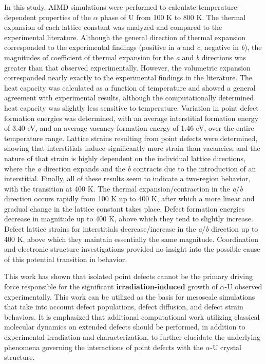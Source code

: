 \documentclass[utf8]{frontiersSCNS} %
\providecommand{\DIFaddtex}[1]{{\bf #1}} %
\providecommand{\DIFdeltex}[1]{} %
\providecommand{\DIFaddbegin}{\protect\color{blue}} %
\providecommand{\DIFaddend}{\protect\color{black}} %
\providecommand{\DIFdelbegin}{\protect\color{red}} %
\providecommand{\DIFdelend}{\protect\color{black}} %
\providecommand{\DIFadd}[1]{\texorpdfstring{\DIFaddtex{#1}}{#1}} %
\providecommand{\DIFdel}[1]{\texorpdfstring{\DIFdeltex{#1}}{}} %
\begin{document}
In this study, AIMD simulations were performed to calculate temperature-dependent properties of the $\alpha$ phase of U from 100 K to 800 K. The thermal expansion of each \DIFdelbegin \DIFdel{individual }\DIFdelend lattice constant was analyzed and compared to the experimental literature. Although the general direction of thermal expansion corresponded to the experimental findings (positive in \textit{a} and \textit{c}, negative in \textit{b}), the magnitudes of coefficient of thermal expansion for the \textit{a} and \textit{b} directions was greater than that observed experimentally. However, the volumetric expansion corresponded nearly exactly to the experimental findings in the literature. The heat capacity was calculated as a function of temperature and showed a general agreement with experimental results, although the computationally determined heat capacity was slightly less sensitive to temperature. Variation in point defect formation energies was determined, with an average interstitial formation energy of 3.40 eV, and an average vacancy formation energy of 1.46 eV, over the entire temperature range. Lattice strains resulting from point defects were determined, showing that interstitials induce significantly more strain than vacancies, and the nature of that strain is highly dependent on the individual lattice directions, where the \textit{a} direction expands and the \textit{b} contracts due to the introduction of an interstitial. Finally, all of these results seem to indicate a two-region behavior, with the transition at 400 K. The thermal expansion\DIFdelbegin \DIFdel{expansion}\DIFdelend /contraction in the \textit{a}/\textit{b} direction occurs rapidly from 100 K up to 400 K, after which a more linear and gradual change in the lattice constant takes place. Defect formation energies decrease in magnitude up to 400 K, above which they tend to slightly increase. Defect lattice strains for interstitials decrease/increase in the \textit{a}/\textit{b} direction up to 400 K, above which they maintain essentially the same magnitude. Coordination and electronic structure investigations provided no insight into the possible cause of this potential transition in behavior. 

This work has shown that isolated point defects cannot be the primary driving force responsible for the significant \DIFdelbegin \DIFdel{irradiation induced }\DIFdelend \DIFaddbegin \DIFadd{irradiation-induced }\DIFaddend growth of $\alpha$-U observed experimentally. This work can be utilized as the basis for mesoscale simulations that take into account defect populations, defect diffusion, and defect strain behaviors. It is emphasized that additional computational work utilizing classical molecular dynamics on extended defects should be performed, in addition to experimental irradiation and characterization, to further elucidate the underlying phenomena governing the interactions of point defects with the $\alpha$-U crystal structure. 
\end{document}

